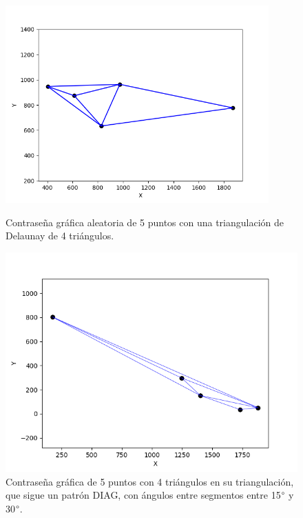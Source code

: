 \documentclass[12pt]{report}
\begin{document}
	\begin{figure}[h]
	\centering
	\begin{minipage}[t]{0.45\textwidth}
		\centering
		\includegraphics[width=0.9\textwidth]{alea4td.png}
		\caption{Contraseña gráfica aleatoria de 5 puntos con una triangulación de Delaunay de 4 triángulos.}
		\label{4TD}
		
	\end{minipage}\hfill
	\begin{minipage}[t]{0.45\textwidth}
		\centering
		\includegraphics[width=0.9\linewidth]{4td30.png}  %
		\caption{Contraseña gráfica de 5 puntos con 4 triángulos en su triangulación, que sigue un patrón DIAG, con ángulos entre segmentos entre 15$\degree$ y 30$\degree$.}
		\label{4td30}
	\end{minipage}
\end{figure}
\end{document}
